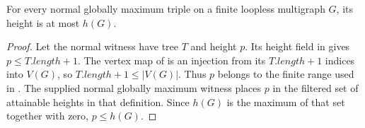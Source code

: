 \begin{lemma}
For every normal globally maximum triple on a finite loopless multigraph
$G$, its height is at most $h(G)$.
\end{lemma}
\begin{proof}
Let the normal witness have tree $T$ and height $p$.  Its height field in
 gives
$p\leq T.length+1$.  The vertex map of  is an
injection from its $T.length+1$ indices into $V(G)$, so
$T.length+1\leq |V(G)|$.  Thus $p$ belongs to the finite range used in
.  The supplied normal globally maximum
witness places $p$ in the filtered set of attainable heights in that
definition.  Since $h(G)$ is the maximum of that set together with zero,
$p\leq h(G)$.
\end{proof}
